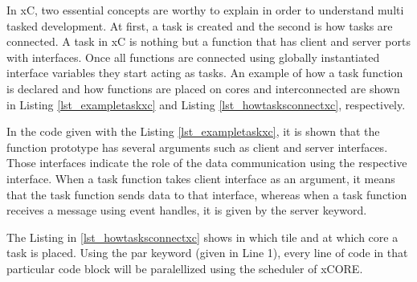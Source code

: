 In xC, two essential concepts are worthy to explain in order to understand multi tasked development. At first, a task is created and the second is how tasks are connected. A task in xC is nothing but a function that has client and server ports with interfaces. Once all functions are connected using globally instantiated interface variables they start acting as tasks. An example of how a task function is declared and how functions are placed on cores and interconnected are shown in Listing \ref{lst_exampletaskxc} and Listing \ref{lst_howtasksconnectxc}, respectively.



In the code given with the Listing \ref{lst_exampletaskxc}, it is shown that the function prototype has several arguments such as client and server interfaces. Those interfaces indicate the role of the data communication using the respective interface. When a task function takes client interface as an argument, it means that the task function sends data to that interface, whereas when a task function receives a message using event handles, it is given by the server keyword.



The Listing in \ref{lst_howtasksconnectxc} shows in which tile and at which core a task is placed. Using the par keyword (given in Line 1), every line of code in that particular code block will be paralellized using the scheduler of xCORE. 

